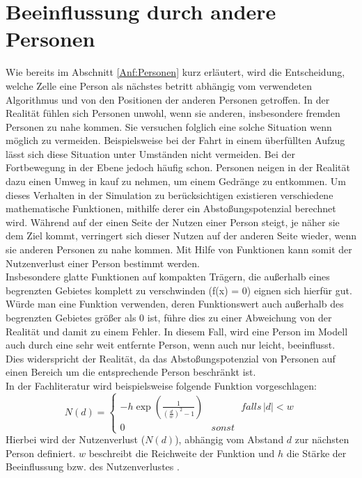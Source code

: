 \section{Beeinflussung durch andere Personen} 
\label{Personenpotenzial}

Wie bereits im Abschnitt \ref{Anf:Personen} kurz erläutert, wird die Entscheidung, welche Zelle eine Person als nächstes betritt abhängig vom verwendeten Algorithmus und von den Positionen der anderen Personen getroffen. In der Realität fühlen sich Personen unwohl, wenn sie anderen, insbesondere fremden Personen zu nahe kommen. Sie versuchen folglich eine solche Situation wenn möglich zu vermeiden. Beispielsweise bei der Fahrt in einem überfüllten Aufzug lässt sich diese Situation unter Umständen nicht vermeiden. Bei der Fortbewegung in der Ebene jedoch häufig schon. Personen neigen in der Realität dazu einen Umweg in kauf zu nehmen, um einem Gedränge zu entkommen. Um dieses Verhalten in der Simulation zu berücksichtigen existieren verschiedene mathematische Funktionen, mithilfe derer ein Abstoßungspotenzial berechnet wird. Während auf der einen Seite der Nutzen einer Person steigt, je näher sie dem Ziel kommt, verringert sich dieser Nutzen auf der anderen Seite wieder, wenn sie anderen Personen zu nahe kommen. Mit Hilfe von Funktionen kann somit der Nutzenverlust einer Person bestimmt werden. \\
Insbesondere glatte Funktionen auf kompakten Trägern, die außerhalb eines begrenzten Gebietes komplett zu verschwinden (f(x) = $0$) eignen sich hierfür gut. Würde man eine Funktion verwenden, deren Funktionswert auch außerhalb des begrenzten Gebietes größer als $0$ ist, führe dies zu einer Abweichung von der Realität und damit zu einem Fehler. In diesem Fall, wird eine Person im Modell auch durch eine sehr weit entfernte Person, wenn auch nur leicht, beeinflusst. Dies widerspricht der Realität, da das Abstoßungspotenzial von Personen auf einen Bereich um die entsprechende Person beschränkt ist. \\
In der Fachliteratur wird beispielsweise folgende Funktion vorgeschlagen:
\begin{displaymath}
\label{equ:NutzenverlustSCHLECHT}
N(d) = 
\left\{ 
\begin{array}{cc}
-h \exp(\frac{1}{(\frac{d}{w})^2 -1}) & \;\;\;\;\;\;\;\;\;\;\; falls\, |d| < w  \\
0 & sonst  
\end{array} 
\right.
\end{displaymath}
Hierbei wird der Nutzenverlust ($N(d)$), abhängig vom Abstand $d$ zur nächsten Person definiert. $w$ beschreibt die Reichweite der Funktion und $h$ die Stärke der Beeinflussung bzw. des Nutzenverlustes \cite{DIETRICH2014841}. \\ 
